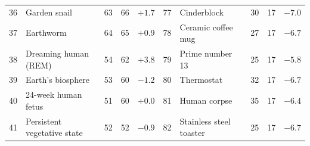 \documentclass[10pt]{article}
\begin{document}
\begin{table}[t]
{\begin{tabular}{rlrrr|rlrrr}
36 & Garden snail & 63 & 66 & $+1.7$ & 77 & Cinderblock & 30 & 17 & $-7.0$ \\
37 & Earthworm & 64 & 65 & $+0.9$ & 78 & Ceramic coffee mug & 27 & 17 & $-6.7$ \\
38 & Dreaming human (REM) & 54 & 62 & $+3.8$ & 79 & Prime number 13 & 25 & 17 & $-5.8$ \\
39 & Earth's biosphere & 53 & 60 & $-1.2$ & 80 & Thermostat & 32 & 17 & $-6.7$ \\
40 & 24-week human fetus & 51 & 60 & $+0.0$ & 81 & Human corpse & 35 & 17 & $-6.4$ \\
41 & Persistent vegetative state & 52 & 52 & $-0.9$ & 82 & Stainless steel toaster & 25 & 17 & $-6.7$ \\
\bottomrule
\end{tabular}}
\end{table}



\end{document}
